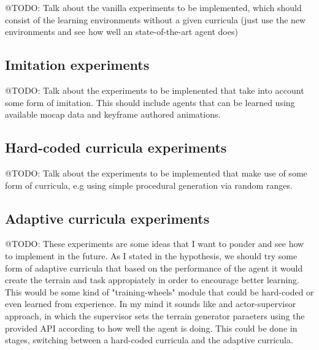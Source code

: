 @TODO: Talk about the vanilla experiments to be implemented, which should
       consist of the learning environments without a given curricula (just use
       the new environments and see how well an state-of-the-art agent does)

\subsection{Imitation experiments}

@TODO: Talk about the experiments to be implenented that take into account some
       form of imitation. This should include agents that can be learned using 
       available mocap data and keyframe authored animations.

\subsection{Hard-coded curricula experiments}

@TODO: Talk about the experiments to be implemented that make use of some form
       of curricula, e.g using simple procedural generation via random ranges.

\subsection{Adaptive curricula experiments}

@TODO: These experiments are some ideas that I want to ponder and see how to implement
       in the future. As I stated in the hypothesis, we should try some form of
       adaptive curricula that based on the performance of the agent it would create
       the terrain and task appropiately in order to encourage better learning. This
       would be some kind of "training-wheels" module that could be hard-coded or even 
       learned from experience. In my mind it sounds like and actor-supervisor approach,
       in which the supervisor sets the terrain generator paraeters using the provided API
       according to how well the agent is doing. This could be done in stages, switching between
       a hard-coded curricula and the adaptive curricula.

